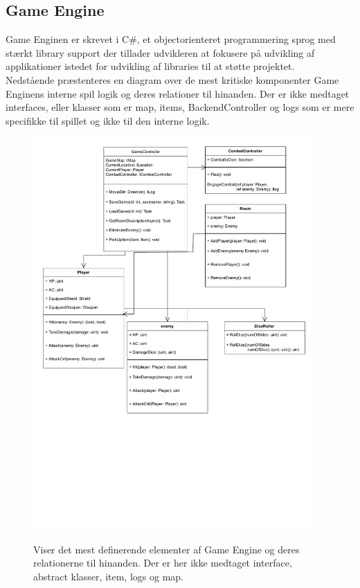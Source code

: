 \subsection{Game Engine}
Game Enginen er skrevet i C\#, et objectorienteret programmering sprog
med stærkt library support der tillader udvikleren at fokusere på udvikling
af applikationer istedet for udvikling af libraries til at støtte projektet. \\

\noindent Nedstående præstenteres en diagram over de mest kritiske komponenter
Game Enginens interne spil logik og deres relationer til hinanden.
Der er ikke medtaget interfaces, eller klasser som er map, items, BackendController 
og logs som er mere specifikke til spillet og ikke til den interne logik.\\

\begin{figure}[h]
  \centering
   \caption{Viser det mest definerende elementer af Game Engine og deres relationerne til hinanden. Der er her ikke medtaget interface,
           abstract klasser, item, logs og map. }%
  \includegraphics[width=0.9\linewidth, height=15cm, trim = 0 8cm 0 3cm]{02-Body/Implementering/GameEngineImplementering/Images/Core Class Diagram.pdf}
  \label{fig:CoreClassDiagram}
\end{figure}





